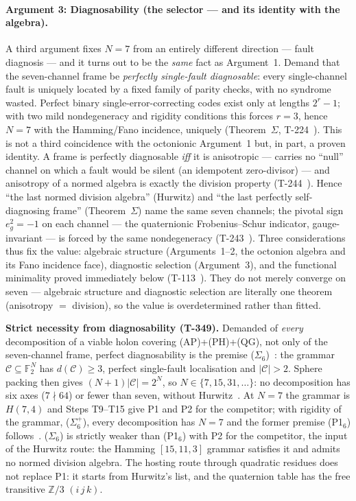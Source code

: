 \paragraph{Argument 3: Diagnosability (the selector --- and its identity with the algebra).}
A third argument fixes $N = 7$ from an entirely different direction --- fault diagnosis ---
and it turns out to be the \emph{same} fact as Argument~1. Demand that the seven-channel
frame be \emph{perfectly single-fault diagnosable}: every single-channel fault is uniquely
located by a fixed family of parity checks, with no syndrome wasted. Perfect binary
single-error-correcting codes exist only at lengths $2^r - 1$; with two mild nondegeneracy
and rigidity conditions this forces $r = 3$, hence $N = 7$ with the Hamming/Fano incidence,
uniquely (Theorem~$\Sigma$, T-224~). This is not a third coincidence with the
octonionic Argument~1 but, in part, a proven identity. A frame is perfectly diagnosable
\emph{iff} it is anisotropic --- carries no ``null'' channel on which a fault would be
silent (an idempotent zero-divisor) --- and anisotropy of a normed algebra is exactly the
division property (T-244~). Hence ``the last normed division algebra'' (Hurwitz)
and ``the last perfectly self-diagnosing frame'' (Theorem~$\Sigma$) name the same seven
channels; the pivotal sign $e_g^2 = -1$ on each channel --- the quaternionic
Frobenius--Schur indicator, gauge-invariant --- is forced by the same nondegeneracy
(T-243~). Three considerations thus fix the value: algebraic structure
(Arguments~1--2, the octonion algebra and its Fano incidence face), diagnostic selection
(Argument~3), and the functional minimality proved immediately below (T-113~).
They do not merely converge on seven --- algebraic structure and diagnostic selection are
literally one theorem (anisotropy $=$ division), so the value is overdetermined rather than
fitted.

\textbf{Strict necessity from diagnosability (T-349).} Demanded of \emph{every}
decomposition of a viable holon covering (AP)+(PH)+(QG), not only of the seven-channel
frame, perfect diagnosability is the premise ($\Sigma_6$)~: the grammar
$\mathcal C \subseteq \mathbb{F}_2^N$ has $d(\mathcal C) \geq 3$, perfect single-fault
localisation and $\lvert\mathcal C\rvert > 2$. Sphere packing then gives
$(N+1)\lvert\mathcal C\rvert = 2^N$, so $N \in \{7, 15, 31, \dots\}$: no decomposition has
six axes ($7 \nmid 64$) or fewer than seven, without Hurwitz~.
At $N = 7$ the grammar is $H(7,4)$ and Steps T9--T15 give P1 and P2 for the competitor;
with rigidity of the grammar, ($\Sigma_6^+$), every decomposition has $N = 7$ and the former
premise (P1$_6$) follows~. ($\Sigma_6$) is strictly weaker than
(P1$_6$) with P2 for the competitor, the input of the Hurwitz route: the Hamming
$[15,11,3]$ grammar satisfies it and admits no normed division algebra. The hosting route
through quadratic residues does not replace P1: it starts from Hurwitz's list, and the
quaternion table has the free transitive $\mathbb{Z}/3$ $(i\,j\,k)$.

